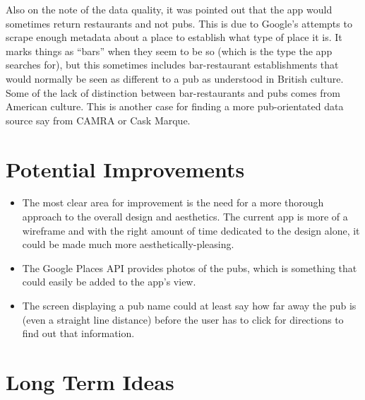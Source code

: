 \documentclass{report}
\begin{document}
Also on the note of the data quality, it was pointed out that the
app would sometimes return restaurants and not pubs. This is due
to Google's attempts to scrape enough metadata about a place
to establish what type of place it is. It marks things as
``bars'' when they seem to be so (which is the type the app
searches for), but this sometimes includes bar-restaurant
establishments that would normally be seen as different to a
pub as understood in British culture. Some of the lack of distinction
between bar-restaurants and pubs comes from American culture. This
is another case for finding a more pub-orientated data source
say from CAMRA or Cask Marque.

\section{Potential Improvements}

\begin{itemize}
\item
  The most clear area for improvement is the need for a more
  thorough approach to the overall design and aesthetics. The current
  app is more of a wireframe and with the right amount of time dedicated
  to the design alone, it could be made much more aesthetically-pleasing.
\item
  The Google Places API provides photos of the pubs, which is something
  that could easily be added to the app's view.
\item
  The screen displaying a pub name could at least say how far away
  the pub is (even a straight line distance) before the user has
  to click for directions to find out that information.
\end{itemize}

\section{Long Term Ideas}
\end{document}
